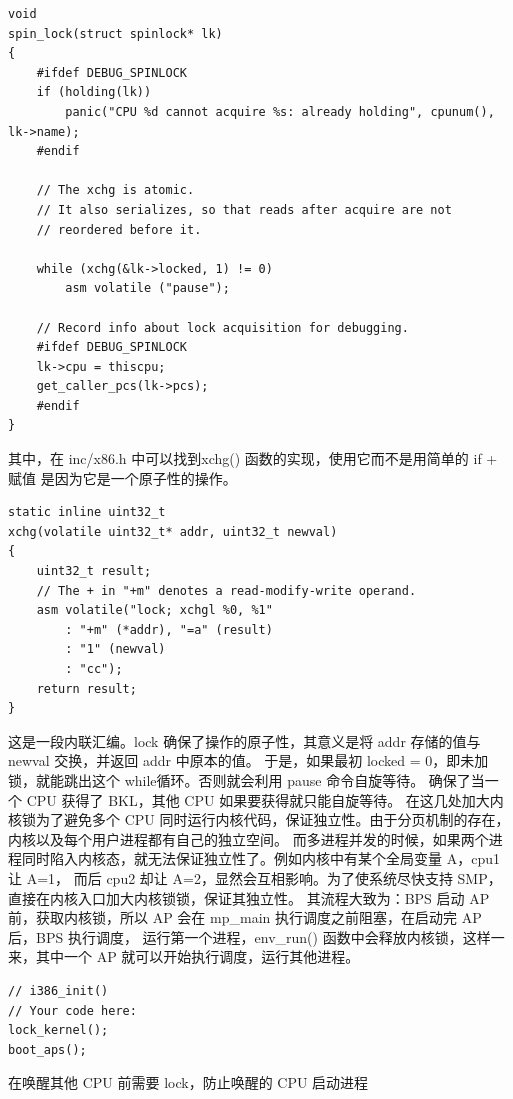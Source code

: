 \documentclass[12pt,a4paper,UTF8]{article}
\begin{document}
    \begin{lstlisting}[style=CPP]
void
spin_lock(struct spinlock* lk)
{
    #ifdef DEBUG_SPINLOCK
    if (holding(lk))
        panic("CPU %d cannot acquire %s: already holding", cpunum(), lk->name);
    #endif
    
    // The xchg is atomic.
    // It also serializes, so that reads after acquire are not
    // reordered before it. 

    while (xchg(&lk->locked, 1) != 0)
        asm volatile ("pause");
    
    // Record info about lock acquisition for debugging.
    #ifdef DEBUG_SPINLOCK
    lk->cpu = thiscpu;
    get_caller_pcs(lk->pcs);
    #endif
}
    \end{lstlisting}

    其中，在 inc/x86.h 中可以找到xchg() 函数的实现，使用它而不是用简单的 if + 赋值 是因为它是一个原子性的操作。
    
    \begin{lstlisting}[style=CPP]
static inline uint32_t
xchg(volatile uint32_t* addr, uint32_t newval)
{
    uint32_t result;
    // The + in "+m" denotes a read-modify-write operand.
    asm volatile("lock; xchgl %0, %1"
        : "+m" (*addr), "=a" (result)
        : "1" (newval)
        : "cc");
    return result;
}
    \end{lstlisting}

    这是一段内联汇编。lock 确保了操作的原子性，其意义是将 addr 存储的值与 newval 交换，并返回 addr 中原本的值。
    于是，如果最初 locked = 0，即未加锁，就能跳出这个 while循环。否则就会利用 pause 命令自旋等待。
    确保了当一个 CPU 获得了 BKL，其他 CPU 如果要获得就只能自旋等待。
    在这几处加大内核锁为了避免多个 CPU 同时运行内核代码，保证独立性。由于分页机制的存在，内核以及每个用户进程都有自己的独立空间。
    而多进程并发的时候，如果两个进程同时陷入内核态，就无法保证独立性了。例如内核中有某个全局变量 A，cpu1 让 A=1， 
    而后 cpu2 却让 A=2，显然会互相影响。为了使系统尽快支持 SMP，直接在内核入口加大内核锁锁，保证其独立性。
    其流程大致为：BPS 启动 AP 前，获取内核锁，所以 AP 会在 mp\_main 执行调度之前阻塞，在启动完 AP 后，BPS 执行调度，
    运行第一个进程，env\_run() 函数中会释放内核锁，这样一来，其中一个 AP 就可以开始执行调度，运行其他进程。
    
    \begin{lstlisting}[style=CPP]
// i386_init()
// Your code here:
lock_kernel();
boot_aps();
    \end{lstlisting}
    在唤醒其他 CPU 前需要 lock，防止唤醒的 CPU 启动进程
\end{document}

